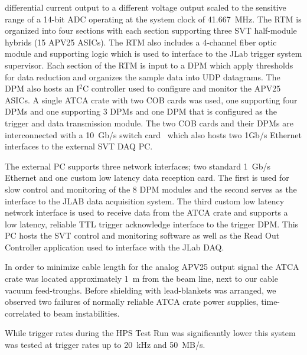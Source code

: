 \documentclass[final,3p,times,twocolumn]{elsarticle}
\begin{document}
differential current output to a different voltage output scaled to the sensitive range of a 14-bit ADC 
operating at the system clock of 41.667~MHz. The RTM is organized 
into four sections with each section supporting three SVT half-module hybrids (15 APV25 ASICs). The 
RTM also includes a 4-channel fiber optic module and supporting logic which is used to interface 
to the JLab trigger system supervisor. Each section of the RTM is input to a DPM which apply 
thresholds for data reduction and organizes the sample data into UDP datagrams. The DPM also hosts 
an I$^{2}$C controller used to configure and monitor the APV25 ASICs. A single ATCA crate with two 
COB cards was used, one supporting four DPMs and one supporting 3 DPMs and one DPM that is 
configured as the trigger and data transmission module. The two COB cards and their DPMs are 
interconnected with a 10~Gb/s switch card~\cite{Larsen:2011zb} which also hosts two 1Gb/s Ethernet 
interfaces to the external SVT DAQ PC.  

The external PC supports three network interfaces; two standard 1~Gb/s Ethernet and one custom low 
latency data reception card. The first is used for slow control and monitoring of the 8 
DPM modules and the second serves as the interface to the JLAB data acquisition system. The third 
custom low latency network interface is used to receive data from the ATCA crate and supports a low 
latency, reliable TTL trigger acknowledge interface to the trigger DPM. This PC hosts the SVT control 
and monitoring software as well as the Read Out Controller application used to interface with the 
JLab DAQ.

In order to minimize cable length for the analog APV25 output signal the ATCA crate was located 
approximately 1~m from the beam line, next to our cable vacuum feed-troughs.   
Before shielding with lead-blankets was arranged, we observed two failures of normally reliable ATCA 
crate power supplies, time-correlated to beam instabilities. 

While trigger rates during the HPS Test Run was significantly lower this system was tested at trigger rates up 
to 20~kHz and 50~MB/s. 
\end{document}
